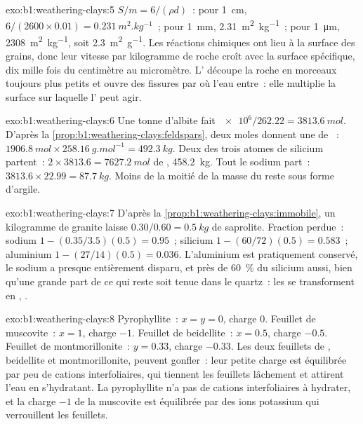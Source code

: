 \begin{solution}{exo:b1:weathering-clays:5}
$S/m = 6/(\rho d)$~: pour \qty{1}{cm}, $6/(2600\times0.01) =
\qty{0.231}{m^2.kg^{-1}}$~; pour \qty{1}{mm}, \qty{2.31}{m^2.kg^{-1}}~; pour
\qty{1}{\micro m}, \qty{2308}{m^2.kg^{-1}}, soit \qty{2.3}{m^2.g^{-1}}.
Les réactions chimiques ont lieu à la surface des grains, donc leur vitesse par
kilogramme de roche croît avec la surface spécifique, dix mille fois du
centimètre au micromètre. L' découpe la roche en morceaux toujours
plus petits et ouvre des fissures par où l'eau entre~: elle multiplie la
surface sur laquelle l' peut agir.
\end{solution}

\begin{solution}{exo:b1:weathering-clays:6}
Une tonne d'albite fait $\num{e6}/262.22 = \qty{3813.6}{mol}$. D'après la
\cref{prop:b1:weathering-clays:feldspars}, deux moles donnent une de ~:
$\qty{1906.8}{mol} \times \qty{258.16}{g.mol^{-1}} = \qty{492.3}{kg}$. Deux des
trois atomes de silicium partent~: $2\times3813.6 = \qty{7627.2}{mol}$ de
, \qty{458.2}{kg}. Tout le sodium part~: $3813.6\times22.99 =
\qty{87.7}{kg}$. Moins de la moitié de la masse du  reste sous forme d'argile.
\end{solution}

\begin{solution}{exo:b1:weathering-clays:7}
D'après la \cref{prop:b1:weathering-clays:immobile}, un kilogramme de granite laisse
$0.30/0.60 = \qty{0.5}{kg}$ de saprolite. Fraction perdue~: sodium $1 -
(0.35/3.5)(0.5) = 0.95$~; silicium $1 - (60/72)(0.5) = 0.583$~; aluminium $1 -
(27/14)(0.5) = 0.036$. L'aluminium est pratiquement conservé, le sodium a presque
entièrement disparu, et près de \qty{60}{\percent} du silicium aussi, bien qu'une grande part de ce qui
reste soit tenue dans le quartz~: les  se transforment en ,
.
\end{solution}

\begin{solution}{exo:b1:weathering-clays:8}
Pyrophyllite~: $x = y = 0$, charge 0. Feuillet de muscovite~: $x = 1$, charge $-1$.
Feuillet de beidellite~: $x = 0.5$, charge $-0.5$. Feuillet de montmorillonite~: $y = 0.33$,
charge $-0.33$. Les deux feuillets de , beidellite et montmorillonite, peuvent
gonfler~: leur petite charge est équilibrée par peu de cations interfoliaires, qui tiennent les
feuillets lâchement et attirent l'eau en s'hydratant. La pyrophyllite n'a pas de
cations interfoliaires à hydrater, et la charge $-1$ de la muscovite est équilibrée par des
ions potassium qui verrouillent les feuillets.
\end{solution}

